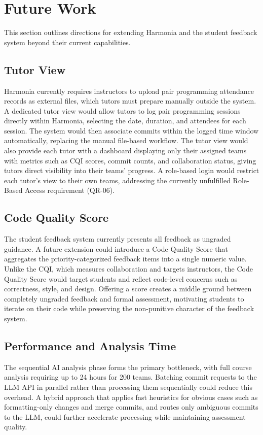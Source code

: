 \documentclass[sigconf]{acmart}
\begin{document}
\section{Future Work}
This section outlines directions for extending Harmonia and the student feedback system beyond their current capabilities.

\subsection{Tutor View}

Harmonia currently requires instructors to upload pair programming attendance records as external files, which tutors must prepare manually outside the system. A dedicated tutor view would allow tutors to log pair programming sessions directly within Harmonia, selecting the date, duration, and attendees for each session. The system would then associate commits within the logged time window automatically, replacing the manual file-based workflow. The tutor view would also provide each tutor with a dashboard displaying only their assigned teams with metrics such as CQI scores, commit counts, and collaboration status, giving tutors direct visibility into their teams' progress. A role-based login would restrict each tutor's view to their own teams, addressing the currently unfulfilled Role-Based Access requirement (QR-06).

\subsection{Code Quality Score}

The student feedback system currently presents all feedback as ungraded guidance. A future extension could introduce a Code Quality Score that aggregates the priority-categorized feedback items into a single numeric value. Unlike the CQI, which measures collaboration and targets instructors, the Code Quality Score would target students and reflect code-level concerns such as correctness, style, and design. Offering a score creates a middle ground between completely ungraded feedback and formal assessment, motivating students to iterate on their code while preserving the non-punitive character of the feedback system.

\subsection{Performance and Analysis Time}

The sequential AI analysis phase forms the primary bottleneck, with full course analysis requiring up to 24 hours for 200 teams. Batching commit requests to the LLM API in parallel rather than processing them sequentially could reduce this overhead. A hybrid approach that applies fast heuristics for obvious cases such as formatting-only changes and merge commits, and routes only ambiguous commits to the LLM, could further accelerate processing while maintaining assessment quality.
\end{document}
